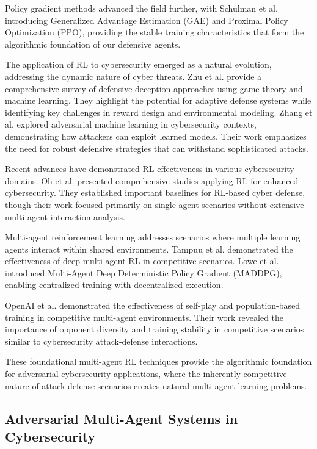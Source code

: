 \documentclass[12pt,oneside]{article}
\begin{document}
Policy gradient methods advanced the field further, with Schulman et al. \cite{schulman2015generalized,schulman2017proximal} introducing Generalized Advantage Estimation (GAE) and Proximal Policy Optimization (PPO), providing the stable training characteristics that form the algorithmic foundation of our defensive agents.

The application of RL to cybersecurity emerged as a natural evolution, addressing the dynamic nature of cyber threats. Zhu et al. \cite{zhu2021survey} provide a comprehensive survey of defensive deception approaches using game theory and machine learning. They highlight the potential for adaptive defense systems while identifying key challenges in reward design and environmental modeling. Zhang et al. \cite{zhang2020adversarial} explored adversarial machine learning in cybersecurity contexts, demonstrating how attackers can exploit learned models. Their work emphasizes the need for robust defensive strategies that can withstand sophisticated attacks.

Recent advances have demonstrated RL effectiveness in various cybersecurity domains. Oh et al. \cite{oh2023applying,oh2024employing} presented comprehensive studies applying RL for enhanced cybersecurity. They established important baselines for RL-based cyber defense, though their work focused primarily on single-agent scenarios without extensive multi-agent interaction analysis.

Multi-agent reinforcement learning addresses scenarios where multiple learning agents interact within shared environments. Tampuu et al. \cite{tampuu2017multiagent} demonstrated the effectiveness of deep multi-agent RL in competitive scenarios. Lowe et al. \cite{lowe2017multi} introduced Multi-Agent Deep Deterministic Policy Gradient (MADDPG), enabling centralized training with decentralized execution. 

OpenAI et al. \cite{openai2019dota} demonstrated the effectiveness of self-play and population-based training in competitive multi-agent environments. Their work revealed the importance of opponent diversity and training stability in competitive scenarios similar to cybersecurity attack-defense interactions.

These foundational multi-agent RL techniques provide the algorithmic foundation for adversarial cybersecurity applications, where the inherently competitive nature of attack-defense scenarios creates natural multi-agent learning problems.

\subsection{Adversarial Multi-Agent Systems in Cybersecurity}
\end{document}
